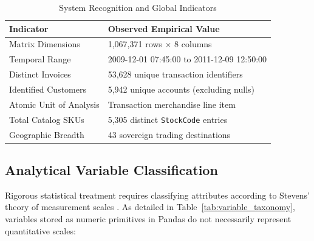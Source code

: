 \documentclass[journal,10pt,twocolumn]{IEEEtran}
\begin{document}
\begin{table}[htbp]
\caption{System Recognition and Global Indicators}
\label{tab:recognition_indicators}
\centering
\begin{tabularx}{\columnwidth}{lX}
\toprule
\textbf{Indicator} & \textbf{Observed Empirical Value} \\
\midrule
Matrix Dimensions & 1,067,371 rows $\times$ 8 columns \\
Temporal Range & 2009-12-01 07:45:00 to 2011-12-09 12:50:00 \\
Distinct Invoices & 53,628 unique transaction identifiers \\
Identified Customers & 5,942 unique accounts (excluding nulls) \\
Atomic Unit of Analysis & Transaction merchandise line item \\
Total Catalog SKUs & 5,305 distinct \texttt{StockCode} entries \\
Geographic Breadth & 43 sovereign trading destinations \\
\bottomrule
\end{tabularx}
\end{table}

\subsection{Analytical Variable Classification}
Rigorous statistical treatment requires classifying attributes according to Stevens' theory of measurement scales \cite{stevens1946theory}. As detailed in Table~\ref{tab:variable_taxonomy}, variables stored as numeric primitives in Pandas do not necessarily represent quantitative scales:
\end{document}
